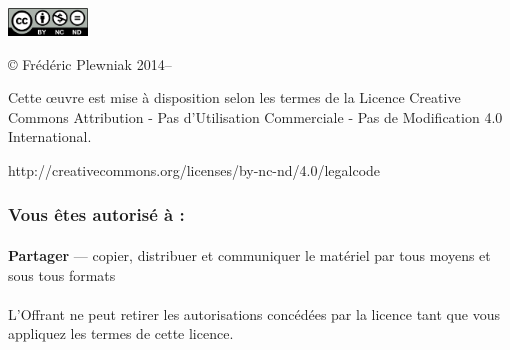 \scriptsize
\par\vspace*{\fill}
\begin{center}
\includegraphics[height=2em]{../../Licence/by-nc-nd}

\copyright{} Frédéric Plewniak 2014--\the\year
\end{center}

\begin{center}
Cette œuvre est mise à disposition selon les termes de la Licence Creative Commons Attribution - Pas d'Utilisation Commerciale - Pas de Modification 4.0 International. 

http://creativecommons.org/licenses/by-nc-nd/4.0/legalcode
\end{center}
\medskip
\subsubsection{{\footnotesize Vous êtes autorisé à :}}

    \paragraph{}\textbf{Partager} — copier, distribuer et communiquer le matériel par tous moyens et sous tous formats

    \paragraph{}L'Offrant ne peut retirer les autorisations concédées par la licence tant que vous appliquez les termes de cette licence.


